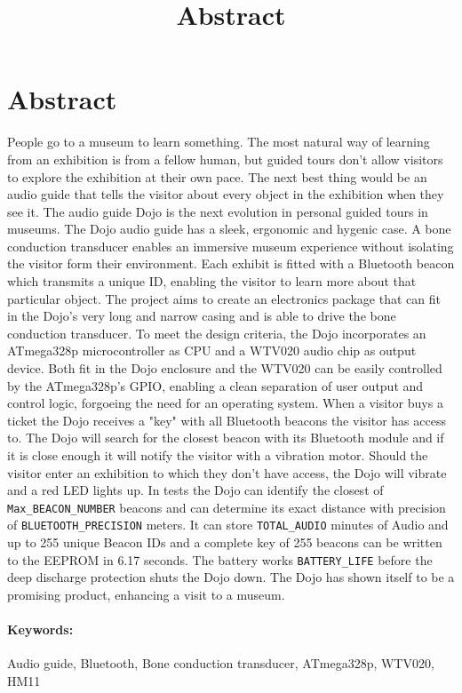 \documentclass[a4paper]{article}
\title{Abstract}
\begin{document}
\section*{Abstract}

People go to a museum to learn something.
The most natural way of learning from an exhibition is from a fellow human, but guided tours don't allow visitors to explore the exhibition at their own pace.
The next best thing would be an audio guide that tells the visitor about every object in the exhibition when they see it.
The audio guide Dojo is the next evolution in personal guided tours in museums.
The Dojo audio guide has a sleek, ergonomic and hygenic case.
A bone conduction transducer enables an immersive museum experience without isolating the visitor form their environment.
Each exhibit is fitted with a Bluetooth beacon which transmits a unique ID, enabling the visitor to learn more about that particular object.
The project aims to create an electronics package that can fit in the Dojo's very long and narrow casing and is able to drive the bone conduction transducer.
To meet the design criteria, the Dojo incorporates an ATmega328p microcontroller as CPU and a WTV020 audio chip as output device.
Both fit in the Dojo enclosure and the WTV020 can be easily controlled by the ATmega328p's GPIO, enabling a clean separation of user output and control logic, forgoeing the need for an operating system.
When a visitor buys a ticket the Dojo receives a "key" with all Bluetooth beacons the visitor has access to.
The Dojo will search for the closest beacon with its Bluetooth module and if it is close enough it will notify the visitor with a vibration motor.
Should the visitor enter an exhibition to which they don't have access, the Dojo will vibrate and a red LED lights up.
In tests the Dojo can identify the closest of \texttt{Max\_BEACON\_NUMBER} beacons and can determine its exact distance with precision of \texttt{BLUETOOTH\_PRECISION} meters.
It can store \texttt{TOTAL\_AUDIO} minutes of Audio and up to 255 unique Beacon IDs and a complete key of 255 beacons can be written to the EEPROM in 6.17 seconds.
The battery works \texttt{BATTERY\_LIFE} before the deep discharge protection shuts the Dojo down.
The Dojo has shown itself to be a promising product, enhancing a visit to a museum.

\paragraph{Keywords:} Audio guide, Bluetooth, Bone conduction transducer, ATmega328p, WTV020, HM11
\end{document}
